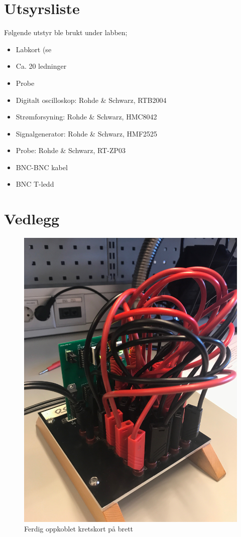 \documentclass{article}
\begin{document}
\section{Utsyrsliste}
Følgende utstyr ble brukt under labben;
\begin{itemize}
	\item Labkort (se %
	\item Ca. 20 ledninger
	\item Probe
	\item Digitalt oscilloskop: Rohde \& Schwarz, RTB2004
	\item Strømforsyning: Rohde \& Schwarz, HMC8042
	\item Signalgenerator: Rohde \& Schwarz, HMF2525
	\item Probe: Rohde \& Schwarz, RT-ZP03
	\item BNC-BNC kabel
	\item BNC T-ledd
\end{itemize}

\section{Vedlegg}
\begin{figure}[H]
	\centering
	\includegraphics[width=1\linewidth]{IMG_2923}
	\caption{Ferdig oppkoblet kretskort på brett}
	\label{fig:IMG_2923}
\end{figure}
\end{document}

